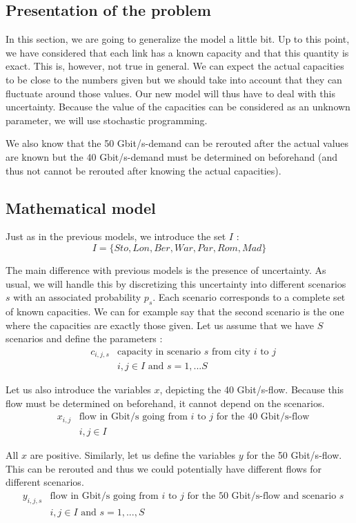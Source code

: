 \subsection{Presentation of the problem}
In this section, we are going to generalize the model a little bit. Up to this point, we have considered that each link has a known capacity and that this quantity is exact. This is, however, not true in general. We can expect the actual capacities to be close to the numbers given but we should take into account that they can fluctuate around those values. Our new model will thus have to deal with this uncertainty. Because the value of the capacities can be considered as an unknown parameter, we will use stochastic programming.

We also know that the 50 Gbit/s-demand can be rerouted after the actual values are known but the 40 Gbit/s-demand must be determined on beforehand (and thus not cannot be rerouted after knowing the actual capacities).

\subsection{Mathematical model}
Just as in the previous models, we introduce the set $I$ :
$$I = \{ Sto,Lon,Ber,War,Par,Rom,Mad\}$$

The main difference with previous models is the presence of uncertainty. As usual, we will handle this by discretizing this uncertainty into different scenarios $s$ with an associated probability $p_s$. Each scenario corresponds to a complete set of known capacities. We can for example say that the second scenario is the one where the capacities are exactly those given. Let us assume that we have $S$ scenarios and define the parameters : 
\begin{align*}
&c_{i,j,s} &\text{capacity in scenario $s$ from city $i$ to $j$} \\
& &i,j \in I \text{ and } s=1,...S
\end{align*}

Let us also introduce the variables $x$, depicting the 40 Gbit/s-flow. Because this flow must be determined on beforehand, it cannot depend on the scenarios.
\begin{align*}
&x_{i,j} &\text{flow in Gbit/s going from $i$ to $j$ for the 40 Gbit/s-flow}\\
& &i,j \in I
\end{align*}

All $x$ are positive. Similarly, let us define the variables $y$ for the 50 Gbit/s-flow. This can be rerouted and thus we could potentially have different flows for different scenarios.
\begin{align*}
&y_{i,j,s} &\text{flow in Gbit/s going from $i$ to $j$ for the 50 Gbit/s-flow and scenario $s$}\\
& &i,j \in I \text{ and } s=1,...,S
\end{align*}

